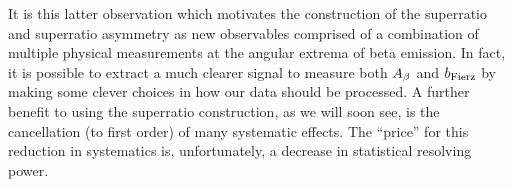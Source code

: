 It is this latter observation which motivates the construction of the superratio and superratio asymmetry as new observables comprised of a combination of multiple physical measurements at the angular extrema of beta emission.  In fact, it is possible to extract a much clearer signal to measure both $A_{\beta}$ and $b_{\mathrm{Fierz}}$ by making some clever choices in how our data should be processed.  A further benefit to using the superratio construction, as we will soon see, is the cancellation (to first order) of many systematic effects.  The ``price'' for this reduction in systematics is, unfortunately, a decrease in statistical resolving power.  
%
%







